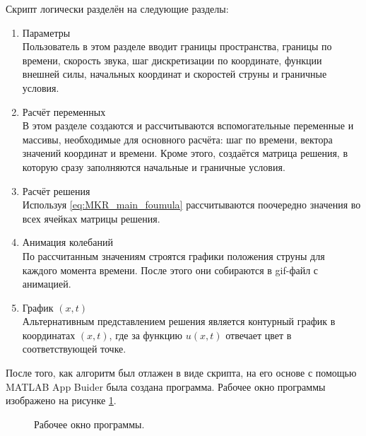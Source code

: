 \documentclass[12pt,a4paper,russian]{report}
\begin{document}
	 Скрипт логически разделён на следующие разделы:
	 \begin{enumerate}
	 	\item Параметры \\
	 	Пользователь в этом разделе вводит границы пространства, границы по времени, скорость звука, шаг дискретизации по координате, функции внешней силы, начальных координат и скоростей струны и граничные условия.
	 	
	 	\item  Расчёт переменных \\
	 	В этом разделе создаются и рассчитываются вспомогательные переменные и массивы, необходимые для основного расчёта: шаг по времени, вектора значений координат и времени. Кроме этого, создаётся матрица решения, в которую сразу заполняются начальные и граничные условия.
	 	
	 	\item  Расчёт решения \\
	 	Используя \eqref{eq:MKR_main_foumula} рассчитываются поочередно значения во всех ячейках матрицы решения.
	 	
	 	\item Анимация колебаний \\
	 	По рассчитанным значениям строятся графики положения струны для каждого момента времени. После этого они собираются в gif-файл с анимацией.
	 	
	 	\item График $(x, t)$ \\
	 	Альтернативным представлением решения является контурный график в координатах $(x, t)$, где за функцию $u(x, t)$ отвечает цвет в соответствующей точке.
	 \end{enumerate}
	 
	 
	 После того, как алгоритм был отлажен в виде скрипта, на его основе с помощью MATLAB App Buider была создана программа. Рабочее окно программы изображено на рисунке \ref{img:program}.
	 
	 \begin{figure}[h]
	 	\caption{Рабочее окно программы.}
	 	\label{img:program}
	 \end{figure}
	 
\end{document}
